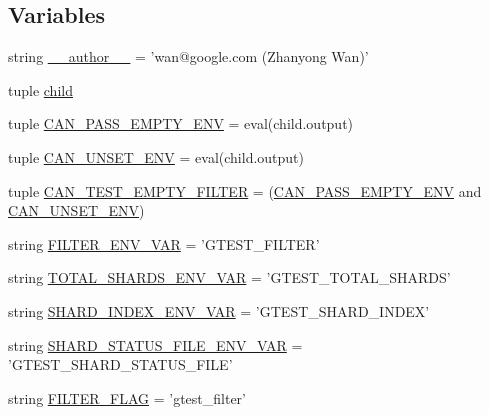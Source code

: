\subsection*{Variables}
\begin{DoxyCompactItemize}
\item 
string \hyperlink{namespacegtest__filter__unittest_ab3118d06edfd385e21cdb729ecebb968}{\-\_\-\-\_\-author\-\_\-\-\_\-} = 'wan@google.\-com (Zhanyong Wan)'
\item 
tuple \hyperlink{namespacegtest__filter__unittest_a158829096400f19be6d8a3ef8ca8b76a}{child}
\item 
tuple \hyperlink{namespacegtest__filter__unittest_a18b756ed54ae48287c75fe522af10a9c}{C\-A\-N\-\_\-\-P\-A\-S\-S\-\_\-\-E\-M\-P\-T\-Y\-\_\-\-E\-N\-V} = eval(child.\-output)
\item 
tuple \hyperlink{namespacegtest__filter__unittest_af361c1fbfcd7dccb753d66208bd86a4e}{C\-A\-N\-\_\-\-U\-N\-S\-E\-T\-\_\-\-E\-N\-V} = eval(child.\-output)
\item 
tuple \hyperlink{namespacegtest__filter__unittest_a7afca8c162042da19f58cb569805d627}{C\-A\-N\-\_\-\-T\-E\-S\-T\-\_\-\-E\-M\-P\-T\-Y\-\_\-\-F\-I\-L\-T\-E\-R} = (\hyperlink{namespacegtest__filter__unittest_a18b756ed54ae48287c75fe522af10a9c}{C\-A\-N\-\_\-\-P\-A\-S\-S\-\_\-\-E\-M\-P\-T\-Y\-\_\-\-E\-N\-V} and \hyperlink{namespacegtest__filter__unittest_af361c1fbfcd7dccb753d66208bd86a4e}{C\-A\-N\-\_\-\-U\-N\-S\-E\-T\-\_\-\-E\-N\-V})
\item 
string \hyperlink{namespacegtest__filter__unittest_a3dbe99165209787d4d138d30673c95f5}{F\-I\-L\-T\-E\-R\-\_\-\-E\-N\-V\-\_\-\-V\-A\-R} = 'G\-T\-E\-S\-T\-\_\-\-F\-I\-L\-T\-E\-R'
\item 
string \hyperlink{namespacegtest__filter__unittest_a3b9a50b994f774c1cebbc52971708e4e}{T\-O\-T\-A\-L\-\_\-\-S\-H\-A\-R\-D\-S\-\_\-\-E\-N\-V\-\_\-\-V\-A\-R} = 'G\-T\-E\-S\-T\-\_\-\-T\-O\-T\-A\-L\-\_\-\-S\-H\-A\-R\-D\-S'
\item 
string \hyperlink{namespacegtest__filter__unittest_a082d5120f29f56d497db94401d773ca7}{S\-H\-A\-R\-D\-\_\-\-I\-N\-D\-E\-X\-\_\-\-E\-N\-V\-\_\-\-V\-A\-R} = 'G\-T\-E\-S\-T\-\_\-\-S\-H\-A\-R\-D\-\_\-\-I\-N\-D\-E\-X'
\item 
string \hyperlink{namespacegtest__filter__unittest_acc2e06353cabc6015c98bc37413a63ee}{S\-H\-A\-R\-D\-\_\-\-S\-T\-A\-T\-U\-S\-\_\-\-F\-I\-L\-E\-\_\-\-E\-N\-V\-\_\-\-V\-A\-R} = 'G\-T\-E\-S\-T\-\_\-\-S\-H\-A\-R\-D\-\_\-\-S\-T\-A\-T\-U\-S\-\_\-\-F\-I\-L\-E'
\item 
string \hyperlink{namespacegtest__filter__unittest_a90fceef31e3329f712cd41244c5e923d}{F\-I\-L\-T\-E\-R\-\_\-\-F\-L\-A\-G} = 'gtest\-\_\-filter'

\end{DoxyCompactItemize}
